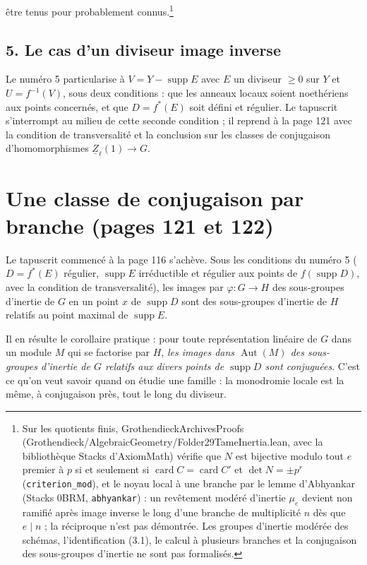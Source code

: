 \documentclass[11pt,a4paper]{article}
\begin{document}
{être tenus pour probablement connus.}\footnote{Sur les quotients finis, GrothendieckArchivesProofs
(Grothendieck/AlgebraicGeometry/Folder29TameInertia.lean, avec la bibliothèque Stacks d'AxiomMath) vérifie que $N$ est
bijective modulo tout $e$ premier à $p$ si et seulement si $\operatorname{card}
C = \operatorname{card} C'$ et $\det N = \pm p^{r}$ (\texttt{criterion\_mod}),
et le noyau local à une branche par le lemme d'Abhyankar (Stacks 0BRM,
\texttt{abhyankar}) : un revêtement modéré d'inertie $\mu_e$ devient non ramifié
après image inverse le long d'une branche de multiplicité $n$ dès que $e \mid n$ ;
la réciproque n'est pas démontrée. Les groupes d'inertie modérée des schémas,
l'identification (3.1), le calcul à plusieurs branches et la conjugaison des
sous-groupes d'inertie ne sont pas formalisés.}

\subsection*{5. Le cas d'un diviseur image inverse}

Le numéro 5 particularise à $V = Y - \operatorname{supp} E$ avec $E$ un
diviseur $\geqslant 0$ sur $Y$ et $U = f^{-1}(V)$, sous deux conditions : que
les anneaux locaux soient noethériens aux points concernés, et que
$D = f^{*}(E)$ soit défini et régulier. Le tapuscrit s'interrompt au milieu de
cette seconde condition ; il reprend à la page 121 avec la condition de transversalité et la conclusion sur les classes de conjugaison
d'homomorphismes $\underline{Z}_{\ell}(1) \to G$.

\section*{Une classe de conjugaison par branche (pages 121 et 122)}

Le tapuscrit commencé à la page 116 s'achève. Sous les conditions du numéro 5
($D = f^{*}(E)$ régulier, $\operatorname{supp} E$ irréductible et régulier aux points
de $f(\operatorname{supp} D)$, avec la condition de transversalité), les
images par $\varphi : G \to H$ des sous-groupes d'inertie de $G$ en un point
$x$ de $\operatorname{supp} D$ sont des sous-groupes d'inertie de $H$ relatifs
au point maximal de $\operatorname{supp} E$.

Il en résulte le corollaire pratique : pour toute représentation linéaire de
$G$ dans un module $M$ qui se factorise par $H$, \emph{les images dans
$\operatorname{Aut}(M)$ des sous-groupes d'inertie de $G$ relatifs aux divers
points de $\operatorname{supp} D$ sont conjuguées}. C'est ce qu'on veut savoir
quand on étudie une famille : la monodromie locale est la même, à conjugaison
près, tout le long du diviseur.
\end{document}

